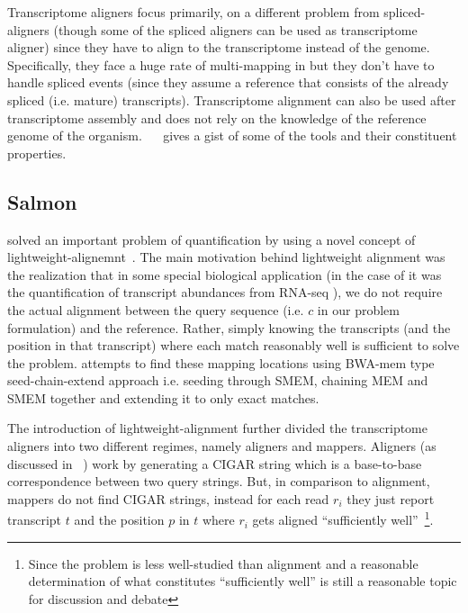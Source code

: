 Transcriptome aligners focus primarily, on a different problem from spliced-aligners (though some of the spliced aligners can be used as transcriptome aligner) since they have to align \reads to the transcriptome instead of the genome. Specifically, they face a huge rate of multi-mapping in \reads but they don't have to handle spliced events (since they assume a reference that consists of the already spliced (i.e. mature) transcripts). Transcriptome alignment can also be used after \denovo transcriptome assembly and does not rely on the knowledge of the reference genome of the organism. ~~\citep{li2010survey} gives a gist of some of the tools and their constituent properties.

\subsection{Salmon~\citep{salmon}} \label{salmon}

\salmon solved an important problem of quantification by using a novel concept of lightweight-alignemnt~\citep{salmon}. The main motivation behind lightweight alignment was the realization that in some special biological application (in the case of \salmon it was the quantification of transcript abundances from RNA-seq \reads), we do not require the actual alignment between the query sequence (i.e. $c$ in our problem formulation) and the reference. Rather, simply knowing the transcripts (and the position in that transcript) where each match reasonably well is sufficient to solve the problem. \salmon attempts to find these mapping locations using BWA-mem type seed-chain-extend approach i.e. seeding through SMEM, chaining MEM and SMEM together and extending it to only exact matches.

The introduction of lightweight-alignment further divided the transcriptome aligners into two different regimes, namely aligners and mappers. Aligners (as discussed in ~) work by generating a CIGAR string which is a base-to-base correspondence between two query strings. But, in comparison to alignment, mappers do not find CIGAR strings, instead for each read $r_i$ they just report transcript $t$ and the position $p$ in $t$ where $r_i$ gets aligned “sufficiently well”~\citep{blog}\footnote{Since the problem is less well-studied than alignment and a reasonable determination of what constitutes “sufficiently well” is still a reasonable topic for discussion and debate}.

